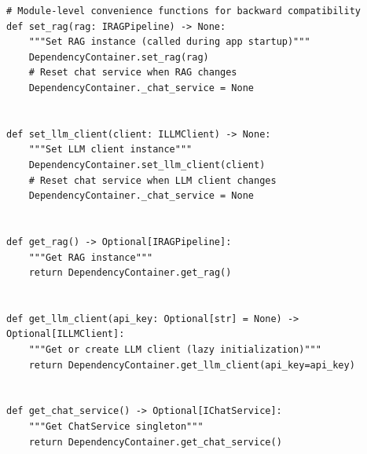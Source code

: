 \begin{lstlisting}[basicstyle=\tiny\ttfamily,breaklines=true]
# Module-level convenience functions for backward compatibility
def set_rag(rag: IRAGPipeline) -> None:
    """Set RAG instance (called during app startup)"""
    DependencyContainer.set_rag(rag)
    # Reset chat service when RAG changes
    DependencyContainer._chat_service = None


def set_llm_client(client: ILLMClient) -> None:
    """Set LLM client instance"""
    DependencyContainer.set_llm_client(client)
    # Reset chat service when LLM client changes
    DependencyContainer._chat_service = None


def get_rag() -> Optional[IRAGPipeline]:
    """Get RAG instance"""
    return DependencyContainer.get_rag()


def get_llm_client(api_key: Optional[str] = None) -> Optional[ILLMClient]:
    """Get or create LLM client (lazy initialization)"""
    return DependencyContainer.get_llm_client(api_key=api_key)


def get_chat_service() -> Optional[IChatService]:
    """Get ChatService singleton"""
    return DependencyContainer.get_chat_service()
\end{lstlisting}

